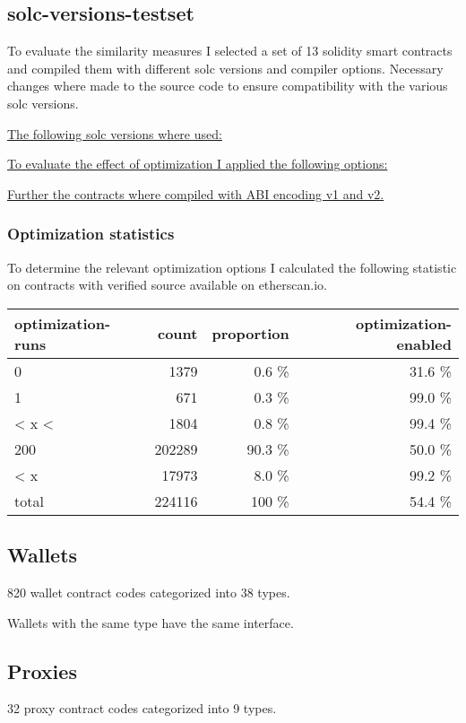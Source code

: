 \documentclass[../main.tex]{subfiles}
\begin{document}
\subsection{solc-versions-testset \cite{solc-versions-testset}}
To evaluate the similarity measures I selected a set of 13 solidity smart contracts and compiled
them with different solc versions and compiler options.
Necessary changes where made to the source code to ensure compatibility with the various solc
versions.

\underline{The following solc versions where used:}
\begin{ol}
  \item {}
  \item {}
  \item {}
  \item {}
\end{ol}
\underline{To evaluate the effect of optimization I applied the following options:}
\begin{ol}
  \item {}
  \item {}
  \item {}
  \item {}
\end{ol}
\underline{Further the contracts where compiled with ABI encoding v1 and v2.}

\subsubsection{Optimization statistics}

To determine the relevant optimization options I calculated the following statistic on contracts with verified source available on etherscan.io.

\begin{tabular}{lrrr}
  optimization-runs & count  & proportion & optimization-enabled \\
  \hline
  0                 & 1379   & 0.6 \%     & 31.6 \%              \\
  1                 & 671    & 0.3 \%     & 99.0 \%              \\
  < x <             & 1804   & 0.8 \%     & 99.4 \%              \\
  200               & 202289 & 90.3 \%    & 50.0 \%              \\
  < x               & 17973  & 8.0 \%     & 99.2 \%              \\
  \hline
  total             & 224116 & 100 \%     & 54.4 \%
\end{tabular}

\subsection{Wallets}
820 wallet contract codes categorized into 38 types.

Wallets with the same type have the same interface.


\subsection{Proxies}
32 proxy contract codes categorized into 9 types.

\end{document}
